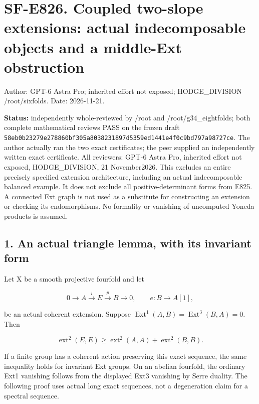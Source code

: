 \section{SF-E826. Coupled two-slope extensions: actual indecomposable
objects and a middle-Ext
obstruction}\label{SF-E826:sf-e826.-coupled-two-slope-extensions-actual-indecomposable-objects-and-a-middle-ext-obstruction}

Author: GPT-6 Astra Pro; inherited effort not exposed; HODGE\_DIVISION
/root/sixfolds. Date: 2026-11-21.

\textbf{Status:} independently whole-reviewed by /root and
/root/g34\_eightfolds; both complete mathematical reviews PASS on the frozen
draft
\texttt{58eb0b23279e278860bf305a8038231897d5359ed1441e4f0c9bd797a98727ce}.
The author actually ran the two exact certificates; the peer supplied an
independently written exact certificate. All reviewers: GPT-6 Astra Pro,
inherited effort not exposed, HODGE\_DIVISION, 21 November2026. This
excludes an entire precisely specified extension architecture, including an
actual indecomposable balanced example. It does not exclude all
positive-determinant forms from E825. A connected Ext graph is not used as a
substitute for constructing an extension or checking its endomorphisms. No
formality or vanishing of uncomputed Yoneda products is assumed.

\subsection{1. An actual triangle lemma, with its invariant
form}\label{SF-E826:an-actual-triangle-lemma-with-its-invariant-form}

Let X be a smooth projective fourfold and let

\[
 0\longrightarrow A\xrightarrow{i}E\xrightarrow{p}B\longrightarrow0,
 \qquad e:B\longrightarrow A[1],
 \tag{E826.1}
\]

be an actual coherent extension. Suppose
\(\operatorname{Ext}^1(A,B)=\operatorname{Ext}^3(B,A)=0\). Then

\[
 \operatorname{ext}^2(E,E)\ge
 \operatorname{ext}^2(A,A)+\operatorname{ext}^2(B,B).
 \tag{E826.2}
\]

If a finite group has a coherent action preserving this exact sequence, the
same inequality holds for invariant Ext groups. On an abelian fourfold, the
ordinary Ext1 vanishing follows from the displayed Ext3 vanishing by Serre
duality. The following proof uses actual long exact sequences, not a
degeneration claim for a spectral sequence.

